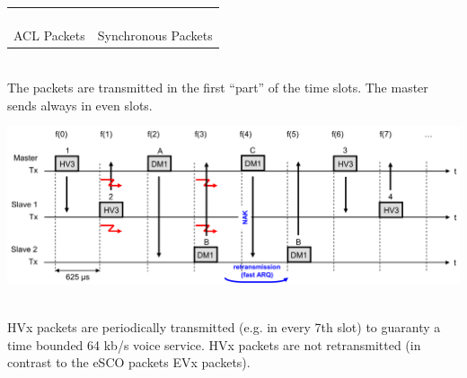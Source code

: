 	\begin{tabular}{ll}
		\parbox{9cm}{
			 \\ ACL Packets 
		}	
		& \parbox{9cm}{
			 \\ Synchronous Packets 
		}
	\end{tabular}	\\

	The packets are transmitted in the first “part” of the time slots. The master sends always 
	in even slots. \\
	
	\begin{minipage}{16cm}
		\includegraphics[width=16cm]{./bilder/bt-packet-transmission.png} 
	\end{minipage} \\
 

	HVx packets are periodically transmitted (e.g. in every 7th slot) to guaranty a time bounded 64 kb/s voice 
	service. HVx packets are not retransmitted (in contrast to the eSCO packets EVx 
	packets). 

